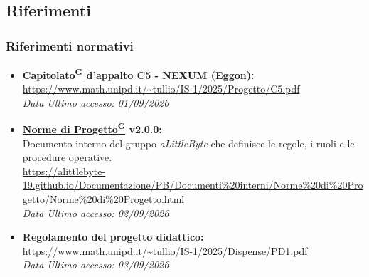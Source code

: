 ﻿\documentclass[a4paper,12pt]{article}
\providecommand{\glslink}[2]{\href{https://alittlebyte-19.github.io/Documentazione/glossario.html\#gls-#1}{\underline{#2}\textsuperscript{\scriptsize G}}}
\begin{document}
\subsection{Riferimenti}
\subsubsection{Riferimenti normativi}
\begin{itemize}
    \item \textbf{\glslink{capitolato}{Capitolato} d'appalto C5 - NEXUM (Eggon):}\\
    \url{https://www.math.unipd.it/~tullio/IS-1/2025/Progetto/C5.pdf}\\
    \textit{Data Ultimo accesso: 01/09/2026}

    \item \textbf{\glslink{norme-di-progetto}{Norme di Progetto} v2.0.0:}\\
    Documento interno del gruppo \textit{aLittleByte} che definisce le regole, i ruoli e le procedure operative.\\
    \url{https://alittlebyte-19.github.io/Documentazione/PB/Documenti%20interni/Norme%20di%20Progetto/Norme%20di%20Progetto.html}\\
    \textit{Data Ultimo accesso: 02/09/2026}

    \item \textbf{Regolamento del progetto didattico:}\\
    \url{https://www.math.unipd.it/~tullio/IS-1/2025/Dispense/PD1.pdf}\\
    \textit{Data Ultimo accesso: 03/09/2026}
\end{itemize}
\end{document}
